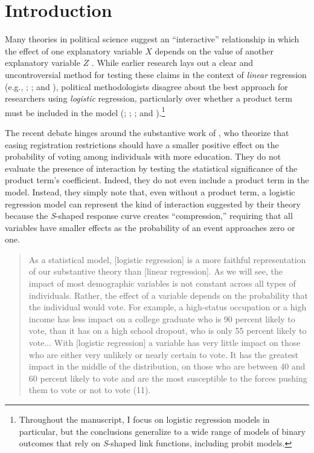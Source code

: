 \documentclass[12pt]{article}
\begin{document}
\doublespace


\section*{Introduction}

Many theories in political science suggest an ``interactive'' relationship in which the effect of one explanatory variable $X$ depends on the value of another explanatory variable $Z$ \citep{ClarkGilliganGolder2006, BerryGolderMilton2012}. While earlier research lays out a clear and uncontroversial method for testing these claims in the context of \textit{linear} regression (e.g., \citealt{KamFranzese2007}; \citealt{BramborClarkGolder2006}; and \citealt{Friedrich1982}), political methodologists disagree about the best approach for researchers using \textit{logistic} regression, particularly over whether a product term must be included in the model (\citealt{Nagler1991}; \citealt{Frant1991}; \citealt{BerryBerry1991}; and \citealt{BerryDeMerittEsarey2010}).\footnote{Throughout the manuscript, I focus on logistic regression models in particular, but the conclusions generalize to a wide range of models of binary outcomes that rely on \textit{S}-shaped link functions, including probit models.}  


The recent debate hinges around the substantive work of \cite{WolfingerRosenstone1980}, who theorize that easing registration restrictions should have a smaller positive effect on the probability of voting among individuals with more education. They do not evaluate the presence of interaction by testing the statistical significance of the product term's coefficient. Indeed, they do not even include a product term in the model. Instead, they simply note that, even without a product term, a logistic regression model can represent the kind of interaction suggested by their theory because the \textit{S}-shaped response curve creates ``compression,'' requiring that all variables have smaller effects as the probability of an event approaches zero or one. 

\begin{quote}\singlespace
As a statistical model, [logistic regression] is a more faithful representation of our substantive theory than [linear regression]. As we will see, the impact of most demographic variables is not constant across all types of individuals. Rather, the effect of a variable depends on the probability that the individual would vote. For example, a high-status occupation or a high income has less impact on a college graduate who is 90 percent likely to vote, than it has on a high school dropout, who is only 55 percent likely to vote... With [logistic regression] a variable has very little impact on those who are either very unlikely or nearly certain to vote. It has the greatest impact in the middle of the distribution, on those who are between 40 and 60 percent likely to vote and are the most susceptible to the forces pushing them to vote or not to vote (11).
\end{quote}
\end{document}
